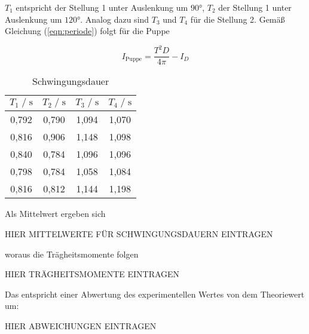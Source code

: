 $T_1$ entspricht der Stellung 1 unter Auslenkung um $90°$, $T_2$ der Stellung 1 unter Auslenkung um $120°$.
Analog dazu sind $T_3$ und $T_4$ für die Stellung 2. Gemäß Gleichung (\autoref{eqn:periode}) folgt für die Puppe


\begin{equation}
  I_{\text{Puppe}} = \frac{T^2D}{4\pi} - I_D
\end{equation}

\begin{table}
    \centering
        \caption{Schwingungsdauer}
        \label{tab:schwingdauer}
        \begin{tabular}{c c c c}
        \toprule
        $T_1 \;/\; \si{\second}$ & $T_2 \;/\; \si{\second}$ & $T_3 \;/\; \si{\second}$ & $T_4 \;/\; \si{\second}$ \\
        \midrule
        0,792 & 0,790 & 1,094 & 1,070 \\
        0,816 & 0,906 & 1,148 & 1,098 \\
        0,840 & 0,784 & 1,096 & 1,096 \\
        0,798 & 0,784 & 1,058 & 1,084 \\
        0,816 & 0,812 & 1,144 & 1,198 \\
        \bottomrule
    \end{tabular}
\end{table}

Als Mittelwert ergeben sich
\begin{center}
  HIER MITTELWERTE FÜR SCHWINGUNGSDAUERN EINTRAGEN
\end{center}

woraus die Trägheitsmomente folgen
\begin{center}
  HIER TRÄGHEITSMOMENTE EINTRAGEN
\end{center}

Das entspricht einer Abwertung des experimentellen Wertes von dem Theoriewert um:
\begin{center}
  HIER ABWEICHUNGEN EINTRAGEN
\end{center}

